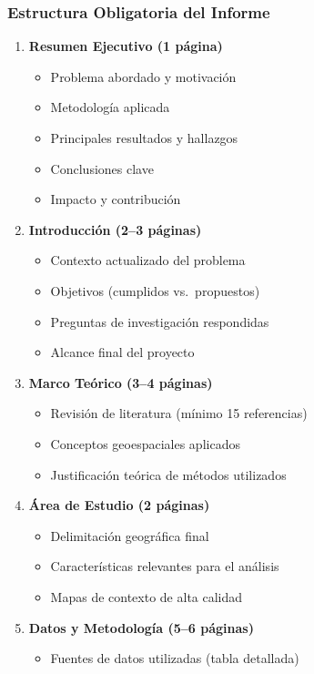 \documentclass[11pt,a4paper]{article}
\begin{document}
\subsubsection{Estructura Obligatoria del Informe}
\begin{enumerate}[leftmargin=*]
\item \textbf{Resumen Ejecutivo (1 página)}
  \begin{itemize}[leftmargin=*]
  \item Problema abordado y motivación
  \item Metodología aplicada
  \item Principales resultados y hallazgos
  \item Conclusiones clave
  \item Impacto y contribución
  \end{itemize}
\item \textbf{Introducción (2--3 páginas)}
  \begin{itemize}[leftmargin=*]
  \item Contexto actualizado del problema
  \item Objetivos (cumplidos vs.\ propuestos)
  \item Preguntas de investigación respondidas
  \item Alcance final del proyecto
  \end{itemize}
\item \textbf{Marco Teórico (3--4 páginas)}
  \begin{itemize}[leftmargin=*]
  \item Revisión de literatura (mínimo 15 referencias)
  \item Conceptos geoespaciales aplicados
  \item Justificación teórica de métodos utilizados
  \end{itemize}
\item \textbf{Área de Estudio (2 páginas)}
  \begin{itemize}[leftmargin=*]
  \item Delimitación geográfica final
  \item Características relevantes para el análisis
  \item Mapas de contexto de alta calidad
  \end{itemize}
\item \textbf{Datos y Metodología (5--6 páginas)}
  \begin{itemize}[leftmargin=*]
  \item Fuentes de datos utilizadas (tabla detallada)

\end{itemize}
\end{enumerate}
\end{document}
